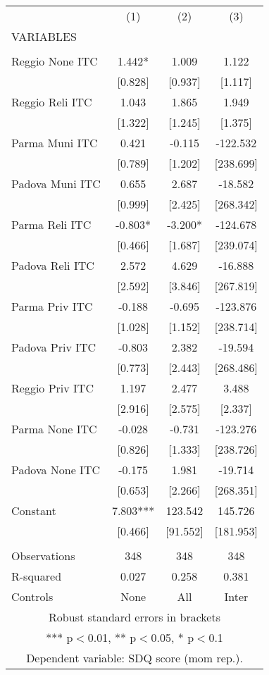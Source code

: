\begin{tabular}{lccc} \hline
 & (1) & (2) & (3) \\
VARIABLES &  &  &  \\ \hline
 &  &  &  \\
Reggio None ITC & 1.442* & 1.009 & 1.122 \\
 & [0.828] & [0.937] & [1.117] \\
Reggio Reli ITC & 1.043 & 1.865 & 1.949 \\
 & [1.322] & [1.245] & [1.375] \\
Parma Muni ITC & 0.421 & -0.115 & -122.532 \\
 & [0.789] & [1.202] & [238.699] \\
Padova Muni ITC & 0.655 & 2.687 & -18.582 \\
 & [0.999] & [2.425] & [268.342] \\
Parma Reli ITC & -0.803* & -3.200* & -124.678 \\
 & [0.466] & [1.687] & [239.074] \\
Padova Reli ITC & 2.572 & 4.629 & -16.888 \\
 & [2.592] & [3.846] & [267.819] \\
Parma Priv ITC & -0.188 & -0.695 & -123.876 \\
 & [1.028] & [1.152] & [238.714] \\
Padova Priv ITC & -0.803 & 2.382 & -19.594 \\
 & [0.773] & [2.443] & [268.486] \\
Reggio Priv ITC & 1.197 & 2.477 & 3.488 \\
 & [2.916] & [2.575] & [2.337] \\
Parma None ITC & -0.028 & -0.731 & -123.276 \\
 & [0.826] & [1.333] & [238.726] \\
Padova None ITC & -0.175 & 1.981 & -19.714 \\
 & [0.653] & [2.266] & [268.351] \\
Constant & 7.803*** & 123.542 & 145.726 \\
 & [0.466] & [91.552] & [181.953] \\
 &  &  &  \\
Observations & 348 & 348 & 348 \\
R-squared & 0.027 & 0.258 & 0.381 \\
 Controls & None & All & Inter \\ \hline
\multicolumn{4}{c}{ Robust standard errors in brackets} \\
\multicolumn{4}{c}{ *** p$<$0.01, ** p$<$0.05, * p$<$0.1} \\
\multicolumn{4}{c}{ Dependent variable: SDQ score (mom rep.).} \\
\end{tabular}
